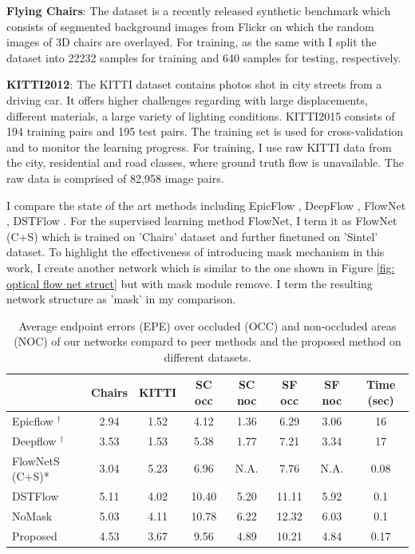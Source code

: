 \documentclass{iitthesis}
\begin{document}
\noindent \textbf{Flying Chairs}: The dataset \cite{DFIB15} is a recently released synthetic benchmark which consists of segmented background images from Flickr on which the random images of 3D chairs are overlayed. For training, as the same with \cite{DFIB15} I split the dataset into 22232 samples for training and 640 samples for testing, respectively.

\noindent \textbf{KITTI2012}: The KITTI dataset \cite{Geiger2012CVPR} contains photos shot in city streets from a driving car. It offers higher challenges regarding with large displacements, different materials, a large variety of lighting conditions. KITTI2015 consists of 194 training pairs and 195 test pairs. The training set is used for cross-validation and to monitor the learning progress. For training, I use raw KITTI data from the city, residential and road classes, where ground truth flow is unavailable. The raw data is comprised of 82,958 image pairs. 

I compare the state of the art methods including EpicFlow \cite{revaud2015epicflow}, DeepFlow \cite{weinzaepfel2013deepflow}, FlowNet \cite{reed2016generative}, DSTFlow \cite{ren2017unsupervised}. For the supervised learning method FlowNet, I term it as FlowNet (C+S) which is trained on 'Chairs' dataset and further finetuned on 'Sintel' dataset. To highlight the effectiveness of introducing mask mechanism in this work, I create another network which is similar to the one shown in Figure \ref{fig: optical flow net struct} but with mask module remove. I term the resulting network structure as 'mask' in my comparison.

\begin{table}[]
\centering
\caption{Average endpoint errors (EPE) over occluded (OCC) and non-occluded areas (NOC) of our networks compard to peer methods and the proposed method on different datasets. }
\label{tab: optical flow comparison}
\begin{tabular}{lccccccc}
\hline
\hline
 & Chairs & KITTI & SC occ & SC noc & SF occ & SF noc & Time (sec)\\ \hline
Epicflow $^\dagger$ & 2.94 & 1.52 & 4.12 & 1.36 & 6.29 & 3.06 & 16\\
Deepflow $^\dagger$ & 3.53 & 1.53 & 5.38 & 1.77 & 7.21 & 3.34 & 17\\
FlowNetS (C+S)* & 3.04 & 5.23 & 6.96 & N.A. & 7.76 & N.A. & 0.08\\
DSTFlow & 5.11 & 4.02 & 10.40 & 5.20 & 11.11 & 5.92 & 0.1\\
NoMask & 5.03 & 4.11 & 10.78 & 6.22 & 12.32 & 6.03 & 0.1\\
Proposed & 4.53 & 3.67 & 9.56 & 4.89 & 10.21 & 4.84 & 0.17\\ \hline
\end{tabular}
\end{table}
\end{document}
